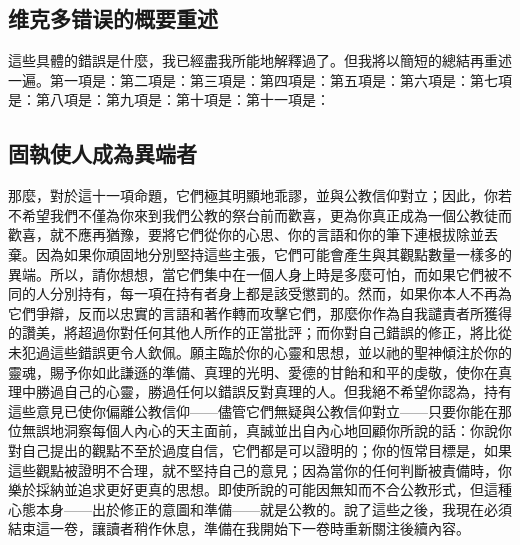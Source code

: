 
\subsection{维克多错误的概要重述}

這些具體的錯誤是什麼，我已經盡我所能地解釋過了。但我將以簡短的總結再重述一遍。第一項是：第二項是：第三項是：第四項是：第五項是：第六項是：第七項是：第八項是：第九項是：第十項是：第十一項是：\par


\subsection{固執使人成為異端者}

那麼，對於這十一項命題，它們極其明顯地乖謬，並與公教信仰對立；因此，你若不希望我們不僅為你來到我們公教的祭台前而歡喜，更為你真正成為一個公教徒而歡喜，就不應再猶豫，要將它們從你的心思、你的言語和你的筆下連根拔除並丟棄。因為如果你頑固地分別堅持這些主張，它們可能會產生與其觀點數量一樣多的異端。所以，請你想想，當它們集中在一個人身上時是多麼可怕，而如果它們被不同的人分別持有，每一項在持有者身上都是該受懲罰的。然而，如果你本人不再為它們爭辯，反而以忠實的言語和著作轉而攻擊它們，那麼你作為自我譴責者所獲得的讚美，將超過你對任何其他人所作的正當批評；而你對自己錯誤的修正，將比從未犯過這些錯誤更令人欽佩。願主臨於你的心靈和思想，並以祂的聖神傾注於你的靈魂，賜予你如此謙遜的準備、真理的光明、愛德的甘飴和和平的虔敬，使你在真理中勝過自己的心靈，勝過任何以錯誤反對真理的人。但我絕不希望你認為，持有這些意見已使你偏離公教信仰——儘管它們無疑與公教信仰對立——只要你能在那位無誤地洞察每個人內心的天主面前，真誠並出自內心地回顧你所說的話：你說你對自己提出的觀點不至於過度自信，它們都是可以證明的；你的恆常目標是，如果這些觀點被證明不合理，就不堅持自己的意見；因為當你的任何判斷被責備時，你樂於採納並追求更好更真的思想。即使所說的可能因無知而不合公教形式，但這種心態本身——出於修正的意圖和準備——就是公教的。說了這些之後，我現在必須結束這一卷，讓讀者稍作休息，準備在我開始下一卷時重新關注後續內容。\par

